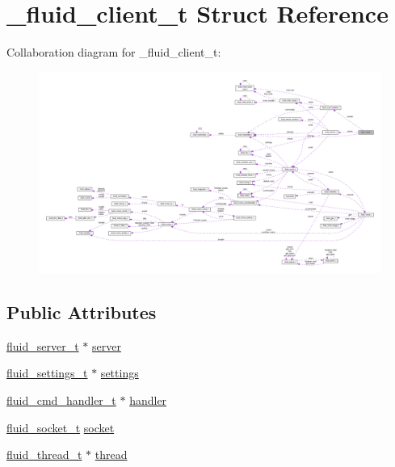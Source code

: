 \hypertarget{struct__fluid__client__t}{}\section{\+\_\+fluid\+\_\+client\+\_\+t Struct Reference}
\label{struct__fluid__client__t}


Collaboration diagram for \+\_\+fluid\+\_\+client\+\_\+t\+:
\nopagebreak
\begin{figure}[H]
\begin{center}
\leavevmode
\includegraphics[width=350pt]{struct__fluid__client__t__coll__graph}
\end{center}
\end{figure}
\subsection*{Public Attributes}
\begin{DoxyCompactItemize}
\item 
\hyperlink{types_8h_a314a569c9a9ae8f99831472efda31141}{fluid\+\_\+server\+\_\+t} $\ast$ \hyperlink{struct__fluid__client__t_a660c989ddc2f760f37a1e17618017938}{server}
\item 
\hyperlink{types_8h_aa363402d3c77333b0f070ba531d034ba}{fluid\+\_\+settings\+\_\+t} $\ast$ \hyperlink{struct__fluid__client__t_a1c3d752d3032e7bb194a837bac2f4ff8}{settings}
\item 
\hyperlink{types_8h_ae1944df078b25beb347abd07e42b35a4}{fluid\+\_\+cmd\+\_\+handler\+\_\+t} $\ast$ \hyperlink{struct__fluid__client__t_a37031c9ec49bd2addb72f4bef0354038}{handler}
\item 
\hyperlink{fluidsynth__priv_8h_ad024f40f94120b0766cda0ad9f47be82}{fluid\+\_\+socket\+\_\+t} \hyperlink{struct__fluid__client__t_aacb39ee52d5abbe0304e179cb0cfb4b2}{socket}
\item 
\hyperlink{fluid__sys_8h_a60a6466e68a45b0f0709f1ebaa7e6f85}{fluid\+\_\+thread\+\_\+t} $\ast$ \hyperlink{struct__fluid__client__t_af50bd49f0c5399b2d5de33b282ce4379}{thread}
\end{DoxyCompactItemize}


